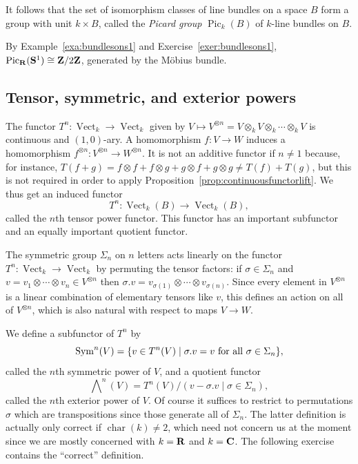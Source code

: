 \documentclass[a4paper,openany]{scrbook}
\DeclareMathOperator{\Vect}{Vect}
\DeclareMathOperator{\Pic}{Pic}
\DeclareMathOperator{\chr}{char}
\newcommand{\exterior}{\bigwedge\nolimits}
\begin{document}
It follows that the set of isomorphism classes of line bundles on a space $B$ form a group with unit $k \times B$, called the \emph{Picard group} $\Pic_k(B)$ of $k$-line bundles on $B$.

\begin{example}
By Example~\ref{exa:bundlesons1} and Exercise~\ref{exer:bundlesons1}, $\Pic_{\R}(\S^1) \cong \Z/2\Z$, generated by the Möbius bundle.
\end{example}

\subsection{Tensor, symmetric, and exterior powers}

The functor $T^n\colon \Vect_k \to \Vect_k$ given by $V \mapsto V^{\otimes n} = V \otimes_k V \otimes_k \cdots \otimes_k V$ is continuous and $(1,0)$-ary. A homomorphism $f\colon V \to W$ induces a homomorphism $f^{\otimes n}\colon V^{\otimes n} \to W^{\otimes n}$. It is not an additive functor if $n \neq 1$ because, for instance, $T(f+g) = f \otimes f + f \otimes g + g \otimes f + g \otimes g \neq T(f)+T(g)$, but this is not required in order to apply Proposition~\ref{prop:continuousfunctorlift}. We thus get an induced functor
\[
T^n\colon \Vect_k(B) \to \Vect_k(B),
\]
called the $n$th tensor power functor. This functor has an important subfunctor and an equally important quotient functor.

The symmetric group $\Sigma_n$ on $n$ letters acts linearly on the functor $T^n\colon \Vect_k \to \Vect_k$ by permuting the tensor factors: if $\sigma \in \Sigma_n$ and $v = v_1 \otimes \cdots \otimes v_n \in V^{\otimes n}$ then $\sigma.v = v_{\sigma(1)} \otimes \cdots \otimes v_{\sigma(n)}$. Since every element in $V^{\otimes n}$ is a linear combination of elementary tensors like $v$, this defines an action on all of $V^{\otimes n}$, which is also natural with respect to maps $V \to W$.

We define a subfunctor of $T^n$ by
\[
\operatorname{Sym}^n(V) = \{v \in T^n(V) \mid \sigma.v=v \text{ for all } \sigma \in \Sigma_n\},
\]
called the $n$th symmetric power of $V$, and a quotient functor
\[
\exterior^n(V) = T^n(V)/(v-\sigma.v\mid \sigma \in \Sigma_n),
\]
called the $n$th exterior power of $V$. Of course it suffices to restrict to permutations $\sigma$ which are transpositions since those generate all of $\Sigma_n$. The latter definition is actually only correct if $\chr(k) \neq 2$, which need not concern us at the moment since we are mostly concerned with $k=\mathbf R$ and $k=\mathbf C$. The following exercise contains the ``correct'' definition.
\end{document}
